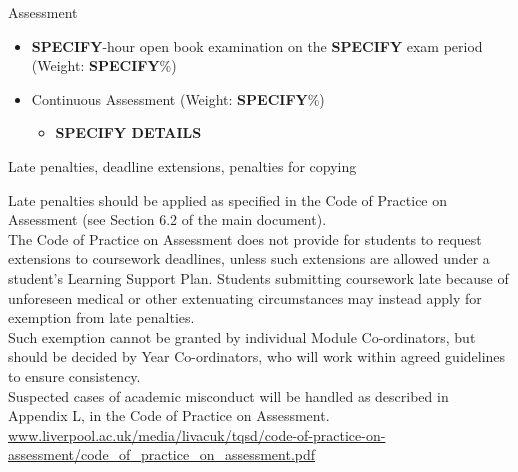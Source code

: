 
\begin{frame}{Assessment}

\begin{itemize}

    \item 
    {\bf \color{red}SPECIFY}-hour open book examination on the {\bf \color{red}SPECIFY} exam period
    (Weight: {\bf \color{red}SPECIFY}\%)
    \vspace{0.2cm}

    \item
    Continuous Assessment
    (Weight: {\bf \color{red}SPECIFY}\%)

      \begin{itemize}
        \item  {\bf \color{red}SPECIFY DETAILS}
      \end{itemize}

\end{itemize}

\begin{blocknote}{Late penalties, deadline extensions, penalties for copying}
\begin{center}
{\tiny
  Late penalties should be applied as specified in the Code of Practice on Assessment (see Section 6.2 of the main document).\\
  The Code of Practice on Assessment does not provide for students to request extensions to coursework deadlines, 
  unless such extensions are allowed under a student’s Learning Support Plan.  
  Students submitting coursework late because of unforeseen medical or other extenuating circumstances may instead 
  apply for exemption from late penalties.\\
  Such exemption cannot be granted by individual Module Co-ordinators, but should be decided by Year Co-ordinators, 
  who will work within agreed guidelines to ensure consistency. \\
  Suspected cases of academic misconduct will be handled as described in Appendix L, in the Code of Practice on Assessment.\\
  \href{www.liverpool.ac.uk/media/livacuk/tqsd/code-of-practice-on-assessment/code\_of\_practice\_on\_assessment.pdf}
       {www.liverpool.ac.uk/media/livacuk/tqsd/code-of-practice-on-assessment/code\_of\_practice\_on\_assessment.pdf}\\
}
\end{center}   
\end{blocknote}
        
\end{frame}
